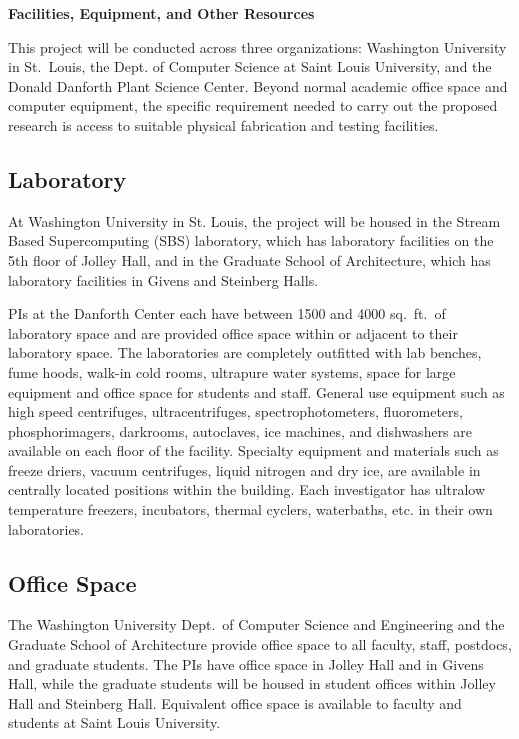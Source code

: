 \documentclass[11pt]{article}
\begin{document}
\pagestyle{empty}
\thispagestyle{empty}

\begin{center}
\textbf{\Large Facilities, Equipment, and Other Resources}
\end{center}

\noindent
This project will be conducted across three organizations:
Washington University
in St.~Louis, the Dept. of Computer Science at Saint Louis University,
and the Donald Danforth Plant Science Center.
Beyond normal academic office space and computer equipment, the 
specific requirement needed to carry out the proposed research is access to
suitable physical fabrication and testing facilities.

\subsection*{Laboratory}

At Washington University in St. Louis, the project will be housed
in the Stream Based Supercomputing
(SBS) laboratory, which has laboratory
facilities on the 5th floor of Jolley Hall,
and in the Graduate School of Architecture, which has laboratory
facilities in Givens and Steinberg Halls.

PIs at the Danforth Center each have between 1500 and 4000 sq.~ft.~of laboratory
space and are provided office space within or adjacent to their laboratory
space.
The laboratories are completely outfitted with lab benches, fume hoods,
walk-in cold rooms, ultrapure water systems, space for large equipment and
office space for students and staff. General use equipment such as high speed
centrifuges, ultracentrifuges, spectrophotometers, fluorometers,
phosphorimagers, darkrooms, autoclaves, ice machines, and dishwashers are
available on each floor of the facility. Specialty equipment and materials such
as freeze driers, vacuum centrifuges, liquid nitrogen and dry ice, are
available in centrally located positions within the building. Each investigator
has ultralow temperature freezers, incubators, thermal cyclers, waterbaths,
etc. in their own laboratories.

\subsection*{Office Space}

The Washington University 
Dept.\ of Computer Science and Engineering and the Graduate School of
Architecture provide office space to
all faculty, staff, postdocs, and graduate students.  The PIs have office
space in Jolley Hall and in Givens Hall,
while the graduate students will be housed in student offices
within Jolley Hall and Steinberg Hall.
Equivalent office space is available to faculty and students at Saint
Louis University.
\end{document}
